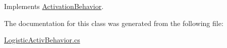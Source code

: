 Implements \mbox{\hyperlink{interface_activation_behavior_a6c7af51cf1b10eaadcbf086231e5539b}{Activation\+Behavior}}.



The documentation for this class was generated from the following file\+:\begin{DoxyCompactItemize}
\item 
\mbox{\hyperlink{_logistic_activ_behavior_8cs}{Logistic\+Activ\+Behavior.\+cs}}\end{DoxyCompactItemize}
